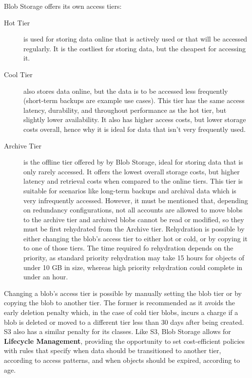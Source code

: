 \bigskip
Blob Storage offers its own access tiers: ~\cite{blobinfo}
\begin{description}
    \item[Hot Tier] is used for storing data online that is actively used or that will be accessed regularly. It is the costliest for storing data, but the cheapest for accessing it.

    \item[Cool Tier] also stores data online, but the data is to be accessed less frequently (short-term backups are example use cases). This tier has the same access latency, durability, and throughout performance as the hot tier, but slightly lower availability. It also has higher access costs, but lower storage costs overall, hence why it is ideal for data that isn't very frequently used.

    \item[Archive Tier] is the offline tier offered by by Blob Storage, ideal for storing data that is only rarely accessed. It offers the lowest overall storage costs, but higher latency and retrieval costs when compared to the online tiers. This tier is suitable for scenarios like long-term backups and archival data which is very infrequently accessed. However, it must be mentioned that, depending on redundancy configurations, not all accounts are allowed to move blobs to the archive tier and archived blobs cannot be read or modified, so they must be first rehydrated from the Archive tier. Rehydration is possible by either changing the blob's access tier to either hot or cold, or by copying it to one of those tiers. The time required fo rehydration depends on the priority, as standard priority rehydration may take 15 hours for objects of under 10 GB in size, whereas high priority rehydration could complete in under an hour.
\end{description}

Changing a blob's access tier is possible by manually setting the blob tier or by copying the blob to another tier. The former is recommended as it avoids the early deletion penalty which, in the case of cold tier blobs, incurs a charge if a blob is deleted or moved to a different tier less than 30 days after being created. S3 also has a similar penalty for its classes. Like S3, Blob Storage allows for \textbf{Lifecycle Management}, providing the opportunity to set cost-efficient policies with rules that specify when data should be transitioned to another tier, according to access patterns, and when objects should be expired, according to age.


